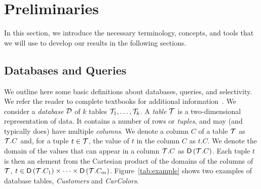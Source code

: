\section{Preliminaries}\label{sec:prelims}
In this section, we introduce the necessary terminology, concepts, and tools
that we will use to develop our results in the following sections.

\subsection{Databases and Queries}\label{sec:dbqueries}
We outline here some basic definitions about databases, queries, and
selectivity. We refer the reader to complete textbooks for additional
information~\citep{GarciaMolinaUW02}.
We consider a \emph{database} ${\cal D}$ of $k$ tables ${\cal T}_1,\dotsc,{\cal T}_k$. 
A \emph{table} ${\cal T}$ is a two-dimensional representation of data. It
contains a number of rows or \emph{tuples}, and may (and typically does) have multiple
\emph{columns}. We denote a column $C$ of a table ${\cal T}$ as ${\cal T}.C$ and, for a
tuple $t\in{\cal T}$, the value of $t$ in the column $C$ as $t.C$. We denote the
domain of the values that can appear in a column ${\cal T}.C$ as $\mathsf{D}\left({\cal T}.C\right)$.
Each tuple $t$ is then an element from the Cartesian product of the domains of
the columns of ${\cal T}$, $t\in \mathsf{D}\left({\cal T}.C_1\right)\times\dotsb\times
\mathsf{D}\left({\cal T}.C_m\right)$. Figure~\ref{tab:example} shows two examples of database
tables, \emph{Customers} and \emph{CarColors}. 

